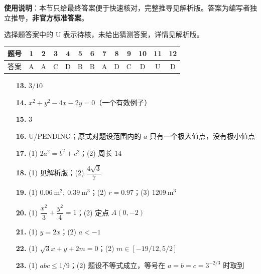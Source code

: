 
\begin{gknotice}
\textbf{使用说明}：本节只给最终答案便于快速核对，完整推导见解析版。答案为编写者独立推导，\textbf{非官方标准答案}。
\end{gknotice}

\begin{gknotice}
选择题答案中的 U 表示待核，未给出猜测答案，详情见解析版。
\end{gknotice}

\begin{center}\begin{tabular}{ccccccccccccc}
\toprule
题号 & 1 & 2 & 3 & 4 & 5 & 6 & 7 & 8 & 9 & 10 & 11 & 12 \\
\midrule
答案 & A & A & C & D & B & B & A & D & C & D & U & D \\
\bottomrule
\end{tabular}\end{center}

\begin{itemize}[leftmargin=2.6em]
  \item[\textbf{13.}] $3/10$
  \item[\textbf{14.}] $x^2+y^2-4x-2y=0$（一个有效例子）
  \item[\textbf{15.}] $3$
  \item[\textbf{16.}] U/PENDING；原式对题设范围内的 $a$ 只有一个极大值点，没有极小值点
\end{itemize}

\begin{itemize}[leftmargin=2.6em]
  \item[\textbf{17.}] (1) $2a^2=b^2+c^2$；(2) 周长 $14$
  \item[\textbf{18.}] (1) 见解析版；(2) $\dfrac{4\sqrt3}{7}$
  \item[\textbf{19.}] (1) $0.06\ \mathrm m^2,\ 0.39\ \mathrm m^3$；(2) $r=0.97$；(3) $1209\ \mathrm m^3$
  \item[\textbf{20.}] (1) $\dfrac{x^2}{3}+\dfrac{y^2}{4}=1$；(2) 定点 $A(0,-2)$
  \item[\textbf{21.}] (1) $y=2x$；(2) $a<-1$
\end{itemize}

\begin{itemize}[leftmargin=2.6em]
  \item[\textbf{22.}] (1) $\sqrt3x+y+2m=0$；(2) $m\in[-19/12,5/2]$
  \item[\textbf{23.}] (1) $abc\le1/9$；(2) 题设不等式成立，等号在 $a=b=c=3^{-2/3}$ 时取到
\end{itemize}
